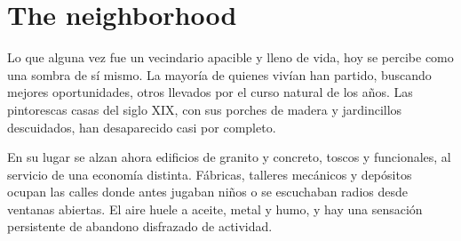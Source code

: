 \section{The neighborhood}

Lo que alguna vez fue un vecindario apacible y lleno de vida, hoy se percibe
como una sombra de sí mismo. La mayoría de quienes vivían han partido, buscando
mejores oportunidades, otros llevados por el curso natural de los años. Las
pintorescas casas del siglo XIX, con sus porches de madera y jardincillos
descuidados, han desaparecido casi por completo.

En su lugar se alzan ahora edificios de granito y concreto, toscos y
funcionales, al servicio de una economía distinta. Fábricas, talleres mecánicos
y depósitos ocupan las calles donde antes jugaban niños o se escuchaban radios
desde ventanas abiertas. El aire huele a aceite, metal y humo, y hay una
sensación persistente de abandono disfrazado de actividad.